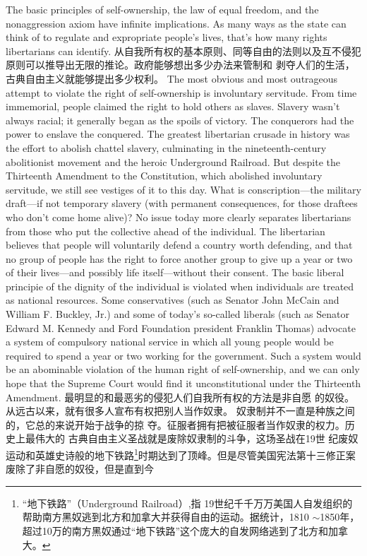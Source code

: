 \begin{paracol}{2}
The basic principles of self-ownership, the law of equal freedom, and the nonaggression axiom have infinite implications.
As many ways as the state can think of to regulate and expropriate people's lives, that's how many rights libertarians can
identify.
\switchcolumn
从自我所有权的基本原则、同等自由的法则以及互不侵犯
原则可以推导出无限的推论。政府能够想出多少办法来管制和
剥夺人们的生活，古典自由主义就能够提出多少权利。
\switchcolumn*
The most obvious and most outrageous attempt to violate
the right of self-ownership is involuntary servitude. From time
immemorial, people claimed the right to hold others as slaves.
Slavery wasn't always racial; it generally began as the spoils of
victory. The conquerors had the power to enslave the conquered. The greatest libertarian crusade in history was the effort  to  abolish  chattel  slavery,  culminating  in  the
nineteenth-century abolitionist movement and the heroic Underground Railroad. But despite the Thirteenth Amendment to
the Constitution, which abolished involuntary servitude, we
still see vestiges of it to this day. What is conscription---the military draft---if not temporary slavery (with permanent consequences, for those draftees who don't come home alive)? No
issue today more clearly separates libertarians from those who
put the collective ahead of the individual. The libertarian believes that people will voluntarily defend a country worth defending, and that no group of people has the right to force
another group to give up a year or two of their lives---and possibly life itself---without their consent. The basic liberal principie of the dignity of the individual is violated when individuals
are treated as national resources. Some conservatives (such as
Senator John McCain and William F. Buckley, Jr.) and some of
today's so-called liberals (such as Senator Edward M. Kennedy
and Ford Foundation president Franklin Thomas) advocate a
system of compulsory national service in which all young people would be required to spend a year or two working for the
government. Such a system would be an abominable violation
of the human right of self-ownership, and we can only hope
that the Supreme Court would find it unconstitutional under
the Thirteenth Amendment.
\switchcolumn
最明显的和最恶劣的侵犯人们自我所有权的方法是非自愿
的奴役。从远古以来，就有很多人宣布有权把别人当作奴隶。
奴隶制并不一直是种族之间的，它总的来说开始于战争的掠
夺。征服者拥有把被征服者当作奴隶的权力。历史上最伟大的
古典自由主义圣战就是废除奴隶制的斗争，这场圣战在19世
纪废奴运动和英雄史诗般的地下铁路\footnote{“地下铁路”（Underground  Railroad）,指 19世纪千千万万美国人自发组织的帮助南方黑奴逃到北方和加拿大并获得自由的运动。据统计，1810 $\sim$1850年，超过10万的南方黑奴通过“地下铁路”这个庞大的自发网络逃到了北方和加拿大。}时期达到了顶峰。但是尽管美国宪法第十三修正案废除了非自愿的奴役，但是直到今

\end{paracol}
